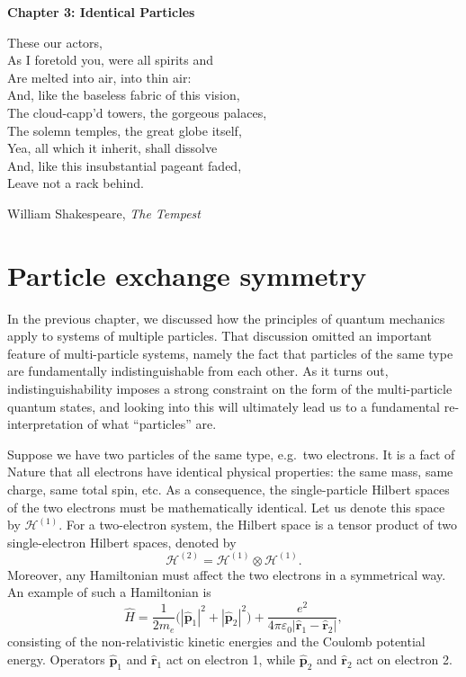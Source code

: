 \documentclass[pra,12pt]{revtex4}
\begin{document}
\begin{center}
{\Large \textbf{Chapter 3: Identical Particles}}
\end{center}

\epigraph{These our actors,\\As I foretold you, were all spirits
  and\\Are melted into air, into thin air: \\And, like the baseless
  fabric of this vision,\\ The cloud-capp'd towers, the gorgeous
  palaces,\\ The solemn temples, the great globe itself,\\ Yea, all
  which it inherit, shall dissolve\\And, like this insubstantial
  pageant faded, \\ Leave not a rack behind.}{William Shakespeare,
  \textit{The Tempest}}


\section{Particle exchange symmetry}

In the previous chapter, we discussed how the principles of quantum
mechanics apply to systems of multiple particles.  That discussion
omitted an important feature of multi-particle systems, namely the
fact that particles of the same type are fundamentally
indistinguishable from each other.  As it turns out,
indistinguishability imposes a strong constraint on the form of the
multi-particle quantum states, and looking into this will ultimately
lead us to a fundamental re-interpretation of what ``particles'' are.

Suppose we have two particles of the same type, e.g.~two electrons.
It is a fact of Nature that all electrons have identical physical
properties: the same mass, same charge, same total spin, etc.  As a
consequence, the single-particle Hilbert spaces of the two electrons
must be mathematically identical.  Let us denote this space by
$\mathscr{H}^{(1)}$.  For a two-electron system, the Hilbert space is
a tensor product of two single-electron Hilbert spaces, denoted by
\begin{equation}
  \mathscr{H}^{(2)} = \mathscr{H}^{(1)} \otimes \mathscr{H}^{(1)}.
\end{equation}
Moreover, any Hamiltonian must affect the two electrons in a
symmetrical way.  An example of such a Hamiltonian is
\begin{equation}
  \hat{H} = \frac{1}{2m_e} \Big(|\hat{\mathbf{p}}_1|^2 + |\hat{\mathbf{p}}_2|^2\Big) + \frac{e^2}{4\pi\varepsilon_0|\hat{\mathbf{r}}_1 - \hat{\mathbf{r}}_2|},
\end{equation}
consisting of the non-relativistic kinetic energies and the Coulomb
potential energy.  Operators $\hat{\mathbf{p}}_1$ and
$\hat{\mathbf{r}}_1$ act on electron 1, while $\hat{\mathbf{p}}_2$ and
$\hat{\mathbf{r}}_2$ act on electron 2.
\end{document}
